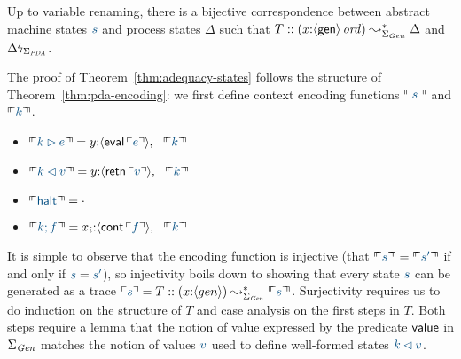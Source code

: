 \bigskip
\begin{theorem}[Encoding] 
\label{thm:adequacy-states}
Up to variable renaming, there is a bijective correspondence between
abstract machine states $\obj{s}$ and process states $\Delta$ such that
$T :: (x{:}{\langle {\sf gen} \rangle}\,{{\it ord}}) \leadsto^*_{\Sigma_{Gen}} \Delta$
and ${\Delta}{\mbox{\lightning}}_{\Sigma_{\it PDA}}$.
\end{theorem}
\bigskip

The proof of Theorem~\ref{thm:adequacy-states} follows the structure
of Theorem~\ref{thm:pda-encoding}: we first define context encoding functions
$\ctxinterp{s}$ and $\ctxinterp{k}$. 
\smallskip
\begin{itemize}
\item $\ctxinterp{k \rhd e} = y{:}\susp{{\sf eval}\,\interp{e}}, ~~
        \ctxinterp{k}$
\item $\ctxinterp{k \lhd v} = y{:}\susp{{\sf retn}\,\interp{v}}, ~~
        \ctxinterp{k}$
\item $\ctxinterp{\sf halt} = \cdot$
\item $\ctxinterp{k; f} = x_{i}{:}\susp{{\sf cont}\,\interp{f}}, ~~ \ctxinterp{k}$
\end{itemize}
\smallskip
It is simple to observe that the encoding function is injective 
(that $\ctxinterp{s} = \ctxinterp{s'}$ if and only if $\obj{s} = \obj{s'}$),
so injectivity boils down to showing that every state $\obj{s}$ can be
generated as a trace 
$\interp{s} = T :: (x{:}\susp{gen}) \leadsto^*_{\Sigma_{\it Gen}} \ctxinterp{s}$.
Surjectivity requires us to do induction on the structure of $T$ and 
case analysis on the first steps in $T$. Both steps require a lemma
that the notion of value expressed by the predicate ${\sf value}$
in $\Sigma_{\it Gen}$ matches the notion of values $\obj{v}$ used to define
well-formed states $\obj{k \lhd v}$. 


